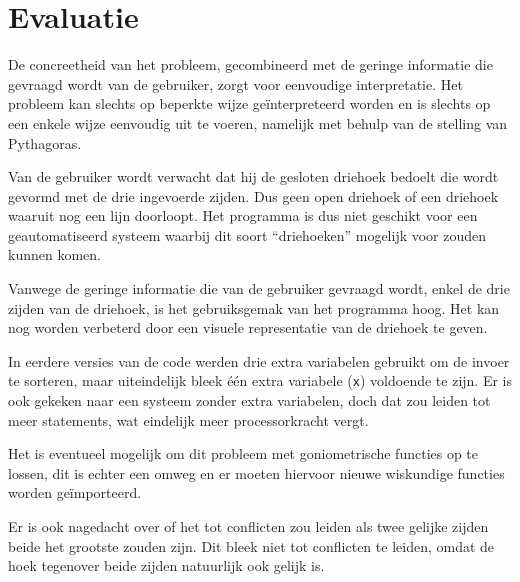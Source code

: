 \section{Evaluatie}
De concreetheid van het probleem, gecombineerd met de geringe informatie die gevraagd wordt van de gebruiker, zorgt voor eenvoudige interpretatie. Het probleem kan slechts op beperkte wijze ge\"interpreteerd worden en is slechts op een enkele wijze eenvoudig uit te voeren, namelijk met behulp van de stelling van Pythagoras.

Van de gebruiker wordt verwacht dat hij de gesloten driehoek bedoelt die wordt gevormd met de drie ingevoerde zijden. Dus geen open driehoek of een driehoek waaruit nog een lijn doorloopt. Het programma is dus niet geschikt voor een geautomatiseerd systeem waarbij dit soort ``driehoeken'' mogelijk voor zouden kunnen komen.

Vanwege de geringe informatie die van de gebruiker gevraagd wordt, enkel de drie zijden van de driehoek, is het gebruiksgemak van het programma hoog. Het kan nog worden verbeterd door een visuele representatie van de driehoek te geven.

In eerdere versies van de code werden drie extra variabelen gebruikt om de invoer te sorteren, maar uiteindelijk bleek \'e\'en extra variabele ({\tt x}) voldoende te zijn. Er is ook gekeken naar een systeem zonder extra variabelen, doch dat zou leiden tot meer statements, wat eindelijk meer processorkracht vergt.

Het is eventueel mogelijk om dit probleem met goniometrische functies op te lossen, dit is echter een omweg en er moeten hiervoor nieuwe wiskundige functies worden ge\"importeerd.

Er is ook nagedacht over of het tot conflicten zou leiden als twee gelijke zijden beide het grootste zouden zijn. Dit bleek niet tot conflicten te leiden, omdat de hoek tegenover beide zijden natuurlijk ook gelijk is.